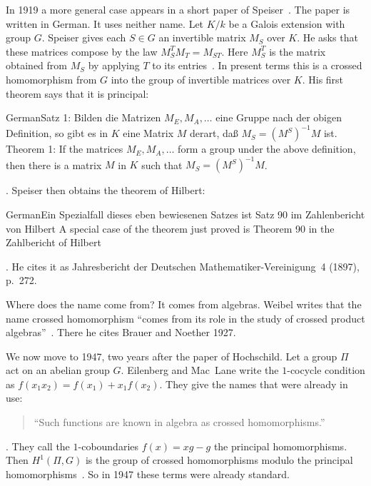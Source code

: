 In 1919 a more general case appears in a short paper of Speiser~\cite{Speiser1919}.
The paper is written in German. It uses neither name. Let $K/k$ be a Galois
extension with group $G$. Speiser gives each $S \in G$ an invertible matrix
$M_S$ over $K$. He asks that these matrices compose by the law
$M_S^{T} M_T = M_{ST}$. Here $M_S^{T}$ is the matrix obtained from $M_S$ by
applying $T$ to its entries~\cite[p.~2]{Speiser1919}. In present terms this
is a crossed homomorphism from $G$ into the group of invertible matrices over
$K$. His first theorem says that it is principal:
\begin{originalquote}{German}{Satz 1: Bilden die Matrizen $M_E, M_A, \ldots$ eine Gruppe nach der obigen Definition, so gibt es in $K$ eine Matrix $M$ derart, da\ss{} $M_S = (M^S)^{-1} M$ ist.}
Theorem 1: If the matrices $M_E, M_A, \ldots$ form a group under the above
definition, then there is a matrix $M$ in $K$ such that $M_S = (M^S)^{-1} M$.
\end{originalquote}
\noindent\cite[p.~2]{Speiser1919}. Speiser then obtains the theorem of
Hilbert:
\begin{originalquote}{German}{Ein Spezialfall dieses eben bewiesenen Satzes ist Satz 90 im Zahlenbericht von Hilbert}
A special case of the theorem just proved is Theorem 90 in the Zahlbericht of
Hilbert
\end{originalquote}
\noindent\cite[p.~3]{Speiser1919}. He cites it as Jahresbericht der Deutschen
Mathematiker-Vereinigung~4 (1897), p.~272.

Where does the name come from? It comes from algebras. Weibel writes that the name crossed
homomorphism ``comes from its role in the study of crossed product
algebras''~\cite[p.~806]{Weibel1999History}. There he cites Brauer and
Noether 1927.

We now move to 1947, two years after the paper of Hochschild. Let a group $\Pi$ act on an abelian group $G$. Eilenberg and Mac~Lane write
the $1$-cocycle condition as $f(x_1x_2) = f(x_1) + x_1 f(x_2)$. They give the
names that were already in use:
\begin{quote}\small
``Such functions are known in algebra as crossed homomorphisms.''
\end{quote}
\noindent\cite[\S 3]{EilenbergMacLane1947}. They call the $1$-coboundaries
$f(x) = xg - g$ the principal homomorphisms. Then $H^1(\Pi,G)$ is the group of
crossed homomorphisms modulo the principal
homomorphisms~\cite[\S 3]{EilenbergMacLane1947}. So in 1947 these terms were
already standard.

